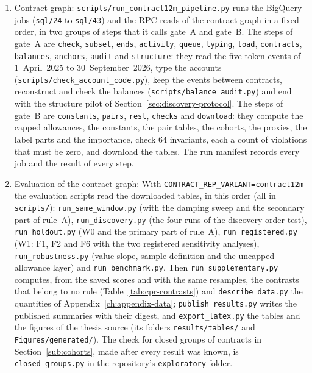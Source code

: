 \begin{enumerate}
\item Contract graph: \texttt{scripts/run\_contract12m\_pipeline.py} runs the BigQuery jobs (\texttt{sql/24} to \texttt{sql/43}) and the RPC reads of the contract graph in a fixed order, in two groups of steps that it calls gate~A and gate~B. The steps of gate~A are \texttt{check}, \texttt{subset}, \texttt{ends}, \texttt{activity}, \texttt{queue}, \texttt{typing}, \texttt{load}, \texttt{contracts}, \texttt{balances}, \texttt{anchors}, \texttt{audit} and \texttt{structure}: they read the five-token events of 1~April~2025 to 30~September~2026, type the accounts (\texttt{scripts/check\_account\_code.py}), keep the events between contracts, reconstruct and check the balances (\texttt{scripts/balance\_audit.py}) and end with the structure pilot of Section~\ref{sec:discovery-protocol}. The steps of gate~B are \texttt{constants}, \texttt{pairs}, \texttt{rest}, \texttt{checks} and \texttt{download}: they compute the capped allowances, the constants, the pair tables, the cohorts, the proxies, the label parts and the importance, check 64 invariants, each a count of violations that must be zero, and download the tables. The run manifest records every job and the result of every step.
\item Evaluation of the contract graph: With \texttt{CONTRACT\_REP\_VARIANT=contract12m} the evaluation scripts read the downloaded tables, in this order (all in \texttt{scripts/}): \texttt{run\_same\_window.py} (with the damping sweep and the secondary part of rule~A), \texttt{run\_discovery.py} (the four runs of the discovery-order test), \texttt{run\_holdout.py} (W0 and the primary part of rule~A), \texttt{run\_registered.py} (W1: F1, F2 and F6 with the two registered sensitivity analyses), \texttt{run\_robustness.py} (value slope, sample definition and the uncapped allowance layer) and \texttt{run\_benchmark.py}. Then \texttt{run\_supplementary.py} computes, from the saved scores and with the same resamples, the contrasts that belong to no rule (Table~\ref{tab:cpr-contrasts}) and \texttt{describe\_data.py} the quantities of Appendix~\ref{ch:appendix-data}; \texttt{publish\_results.py} writes the published summaries with their digest, and \texttt{export\_latex.py} the tables and the figures of the thesis source (its folders \texttt{results/tables/} and \texttt{Figures/generated/}). The check for closed groups of contracts in Section~\ref{sub:cohorts}, made after every result was known, is \texttt{closed\_groups.py} in the repository's \texttt{exploratory} folder.
\end{enumerate}


